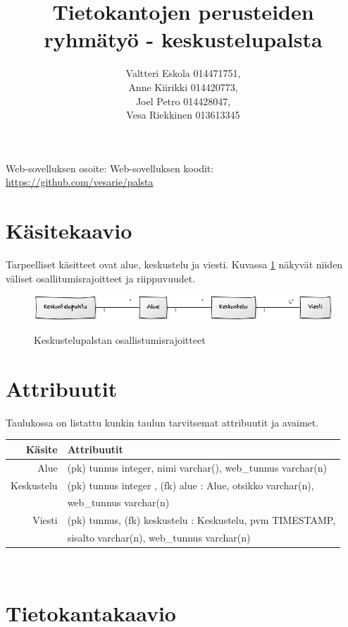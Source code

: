 \documentclass[titlepage]{article}
\title{Tietokantojen perusteiden ryhm\"aty\"o - keskustelupalsta}
\author{Valtteri Eskola 014471751, \\ Anne Kiirikki 014420773, \\ Joel Petro 014428047, \\ Vesa Riekkinen 013613345}
\date{}
\begin{document}
\maketitle

\noindent Web-sovelluksen osoite: %
Web-sovelluksen koodit: \href{https://github.com/vesarie/palsta}{https://github.com/vesarie/palsta} \\

\section*{Käsitekaavio}
Tarpeelliset käsitteet ovat alue, keskustelu ja viesti. Kuvassa \ref{käsite} näkyvät niiden väliset osallitumisrajoitteet ja riippuvuudet.

\begin{figure}[H]
\includegraphics[width=\textwidth]{kasitekaavio}
\label{käsite}
\caption{Keskustelupalstan osallistumisrajoitteet}
\end{figure}

\section*{Attribuutit}

\noindent Taulukossa on listattu kunkin taulun tarvitsemat attribuutit ja avaimet. \\

{
\centering
\begin{tabular}[width=\textwidth]{r|l}

Käsite & Attribuutit \\
\hline
Alue & (pk) tunnus integer, nimi varchar(), web{\_}tunnus varchar(n) \\
Keskustelu & (pk) tunnus integer , (fk) alue : Alue,  otsikko varchar(n), \\ 
		& web{\_}tunnus varchar(n) \\
Viesti & (pk) tunnus, (fk) keskustelu : Keskustelu, pvm TIMESTAMP, \\ 
		& sisalto varchar(n), web{\_}tunnus varchar(n) \\
\end{tabular}
} \\

\section*{Tietokantakaavio}
\end{document}
